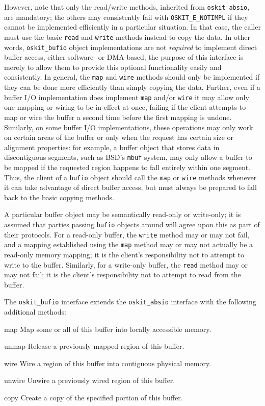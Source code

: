 However, note that only the read/write methods,
inherited from \texttt{oskit_absio}, are mandatory;
the others may consistently fail with \texttt{OSKIT_E_NOTIMPL}
if they cannot be implemented efficiently in a particular situation.
In that case, the caller must use
the basic \texttt{read} and \texttt{write} methods instead to copy the data.
In other words,
\texttt{oskit_bufio} object implementations are not \emph{required}
to implement direct buffer access, either software- or DMA-based;
the purpose of this interface is merely to allow them
to provide this optional functionality easily and consistently.
In general,
the \texttt{map} and \texttt{wire} methods should only be implemented
if they can be done more efficiently than simply copying the data.
Further, even if a buffer I/O implementation
does implement \texttt{map} and/or \texttt{wire}
it may allow only one mapping or wiring to be in effect at once,
failing if the client attempts to map or wire the buffer a second time
before the first mapping is undone.
Similarly, on some buffer I/O implementations,
these operations may only work on certain areas of the buffer
or only when the request has certain size or alignment properties:
for example, a buffer object that stores data in discontiguous segments,
such as BSD's \texttt{mbuf} system,
may only allow a buffer to be mapped
if the requested region happens to fall entirely within one segment.
Thus, the client of a \texttt{bufio} object
should call the \texttt{map} or \texttt{wire} methods
whenever it can take advantage of direct buffer access,
but must always be prepared to fall back to the basic copying methods.

A particular buffer object may be semantically read-only or write-only;
it is assumed that parties passing \texttt{bufio} objects around
will agree upon this as part of their protocols.
For a read-only buffer, the \texttt{write} method may or may not fail,
and a mapping established using the \texttt{map} method
may or may not actually be a read-only memory mapping;
it is the client's responsibility not to attempt to write to the buffer.
Similarly, for a write-only buffer,
the \texttt{read} method may or may not fail;
it is the client's responsibility not to attempt to read from the buffer.

The \texttt{oskit_bufio} interface
extends the \texttt{oskit_absio} interface
with the following additional methods:
\begin{icsymlist}
\item[map]	Map some or all of this buffer into locally accessible memory.
\item[unmap]	Release a previously mapped region of this buffer.
\item[wire]	Wire a region of this buffer into contiguous physical memory.
\item[unwire]	Unwire a previously wired region of this buffer.
\item[copy]	Create a copy of the specified portion of this buffer.
\end{icsymlist}

